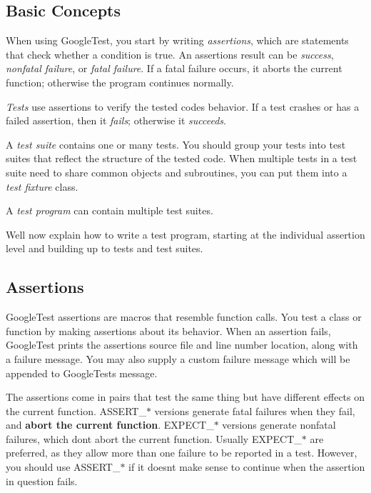 \subsection*{Basic Concepts}

When using Google\+Test, you start by writing {\itshape assertions}, which are statements that check whether a condition is true. An assertion\textquotesingle{}s result can be {\itshape success}, {\itshape nonfatal failure}, or {\itshape fatal failure}. If a fatal failure occurs, it aborts the current function; otherwise the program continues normally.

{\itshape Tests} use assertions to verify the tested code\textquotesingle{}s behavior. If a test crashes or has a failed assertion, then it {\itshape fails}; otherwise it {\itshape succeeds}.

A {\itshape test suite} contains one or many tests. You should group your tests into test suites that reflect the structure of the tested code. When multiple tests in a test suite need to share common objects and subroutines, you can put them into a {\itshape test fixture} class.

A {\itshape test program} can contain multiple test suites.

We\textquotesingle{}ll now explain how to write a test program, starting at the individual assertion level and building up to tests and test suites.

\subsection*{Assertions}

Google\+Test assertions are macros that resemble function calls. You test a class or function by making assertions about its behavior. When an assertion fails, Google\+Test prints the assertion\textquotesingle{}s source file and line number location, along with a failure message. You may also supply a custom failure message which will be appended to Google\+Test\textquotesingle{}s message.

The assertions come in pairs that test the same thing but have different effects on the current function. {\ttfamily A\+S\+S\+E\+R\+T\+\_\+$\ast$} versions generate fatal failures when they fail, and {\bfseries abort the current function}. {\ttfamily E\+X\+P\+E\+C\+T\+\_\+$\ast$} versions generate nonfatal failures, which don\textquotesingle{}t abort the current function. Usually {\ttfamily E\+X\+P\+E\+C\+T\+\_\+$\ast$} are preferred, as they allow more than one failure to be reported in a test. However, you should use {\ttfamily A\+S\+S\+E\+R\+T\+\_\+$\ast$} if it doesn\textquotesingle{}t make sense to continue when the assertion in question fails.

